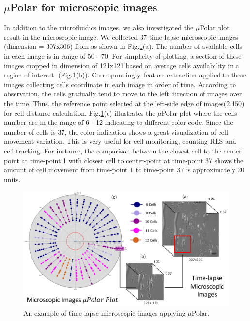 \documentclass[conference]{IEEEtran}
\begin{document}
\subsection{$\mu$Polar for microscopic images}
In addition to the microfluidics images, we also investigated the $\mu$Polar plot result in the microscopic image. We collected 37 time-lapse microscopic images (dimension = 307x306) from \cite{ref05} as shown in Fig.\ref{fig:scopic}(a). The number of available cells in each image is in range of 50 - 70. For simplicity of plotting, a section of these images cropped in dimension of 121x121 based on average cells availability in a region of interest. (Fig.\ref{fig:scopic}(b)). Correspondingly, feature extraction applied to these images collecting cells coordinate in each image in order of time. According to observation, the cells gradually tend to move to the left direction of images over the time. Thus, the reference point selected at the left-side edge of images(2,150) for cell distance calculation. Fig.\ref{fig:scopic}(c) illustrates the $\mu$Polar plot where the cells number are in the range of 6 - 12 indicating to different color code. Since the number of cells is 37, the color indication shows a great visualization of cell movement variation. This is very useful for cell monitoring, counting RLS and cell tracking. For instance, the comparison between the closest cell to the center-point at time-point 1 with closest cell to center-point at time-point 37 shows the amount of cell movement from time-point 1 to time-point 37 is approximately 20 units.        

\begin{figure}
\centering
\includegraphics[width=\textwidth,height=10 cm]{Patterns/microscopic.pdf}
\caption{ An example of time-lapse microscopic images applying  $\mu$Polar.}
\label{fig:scopic}
\end{figure}
\end{document}
